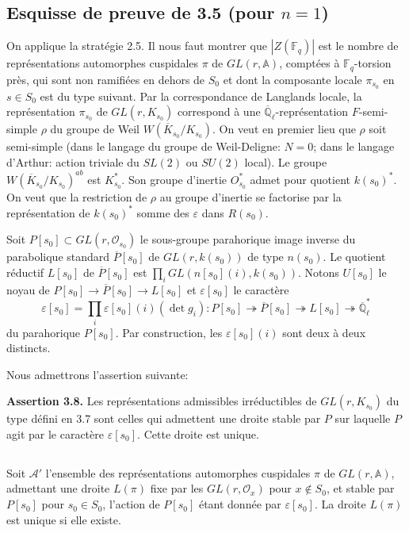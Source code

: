 \documentclass[11pt,a4paper]{article}
\theoremstyle{plain}
\theoremstyle{definition}
\newcommand{\F}{\mathbb{F}}
\newcommand{\Ql}{\overline{\mathbb{Q}}_\ell}
\begin{document}
\subsection{Esquisse de preuve de 3.5 (pour $n = 1$)}
On applique la strat\'egie 2.5. Il nous faut montrer que $|Z(\F_q)|$ est le nombre de repr\'esentations automorphes cuspidales $\pi$ de $GL(r, \mathbb{A})$, compt\'ees \`a $\F_q$-torsion pr\`es, qui sont non ramifi\'ees en dehors de $S_0$ et dont la composante locale $\pi_{s_0}$ en $s \in S_0$ est du type suivant. Par la correspondance de Langlands locale, la repr\'esentation $\pi_{s_0}$ de $GL(r, K_{s_0})$ correspond \`a une $\Ql$-repr\'esentation $F$-semi-simple $\rho$ du groupe de Weil $W(\overline{K}_{s_0}/K_{s_0})$. On veut en premier lieu que $\rho$ soit semi-simple (dans le langage du groupe de Weil-Deligne: $N = 0$; dans le langage d'Arthur: action triviale du $SL(2)$ ou $SU(2)$ local). Le groupe $W(\overline{K}_{s_0}/K_{s_0})^{ab}$ est $K_{s_0}^*$. Son groupe d'inertie $O_{s_0}^*$ admet pour quotient $k(s_0)^*$. On veut que la restriction de $\rho$ au groupe d'inertie se factorise par la repr\'esentation de $k(s_0)^*$ somme des $\varepsilon$ dans $R(s_0)$.

Soit $P[s_0] \subset GL(r, \mathcal{O}_{s_0})$ le sous-groupe parahorique image inverse du parabolique standard $\overline{P}[s_0]$ de $GL(r, k(s_0))$ de type $n(s_0)$. Le quotient r\'eductif $L[s_0]$ de $\overline{P}[s_0]$ est $\prod_i GL(n[s_0](i), k(s_0))$. Notons $U[s_0]$ le noyau de $P[s_0] \to \overline{P}[s_0] \to L[s_0]$ et $\varepsilon[s_0]$ le caract\`ere
\[
\varepsilon[s_0] = \prod_i \varepsilon[s_0](i)(\det g_i): P[s_0] \twoheadrightarrow \overline{P}[s_0] \twoheadrightarrow L[s_0] \twoheadrightarrow \Ql^*
\]
du parahorique $P[s_0]$. Par construction, les $\varepsilon[s_0](i)$ sont deux \`a deux distincts.

Nous admettrons l'assertion suivante:

\textbf{Assertion 3.8.} Les repr\'esentations admissibles irr\'eductibles de $GL(r, K_{s_0})$ du type d\'efini en 3.7 sont celles qui admettent une droite stable par $P$ sur laquelle $P$ agit par le caract\`ere $\varepsilon[s_0]$. Cette droite est unique.

\subsection{}
Soit $\mathcal{A}'$ l'ensemble des repr\'esentations automorphes cuspidales $\pi$ de $GL(r, \mathbb{A})$, admettant une droite $L(\pi)$ fixe par les $GL(r, \mathcal{O}_x)$ pour $x \notin S_0$, et stable par $P[s_0]$ pour $s_0 \in S_0$, l'action de $P[s_0]$ \'etant donn\'ee par $\varepsilon[s_0]$. La droite $L(\pi)$ est unique si elle existe.
\end{document}
